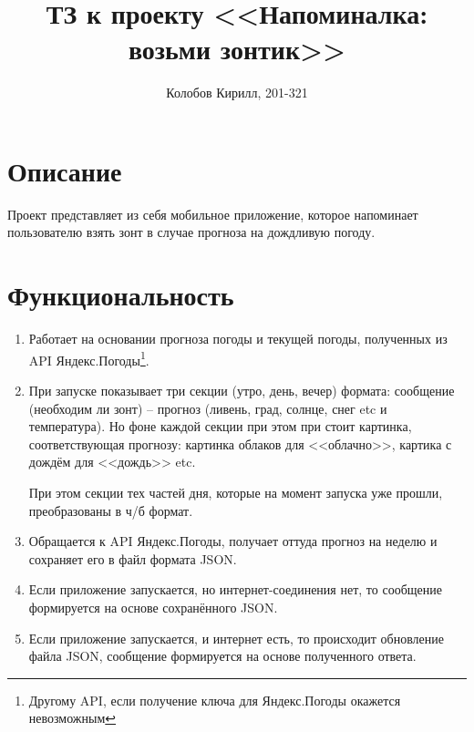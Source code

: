 \documentclass[a4paper,12pt]{report}
\author{Колобов Кирилл, 201-321}
\title{ТЗ к проекту <<Напоминалка: возьми зонтик>>}
\begin{document}
\maketitle

\tableofcontents
\newpage

\section{Описание}
Проект представляет из себя мобильное приложение, которое напоминает пользователю 
взять зонт в случае прогноза на дождливую погоду.

\section{Функциональность}
\begin{enumerate}
\item{Работает на основании прогноза погоды и текущей погоды, полученных из API Яндекс.Погоды\footnote{
      Другому API, если получение ключа для Яндекс.Погоды окажется невозможным}.}
\item{При запуске показывает три секции (утро, день, вечер) формата: 
      сообщение (необходим ли зонт) -- прогноз (ливень, град, солнце, снег etc и температура).
      Но фоне каждой секции при этом при стоит картинка, соответствующая 
      прогнозу: картинка облаков для <<облачно>>, картика с дождём для <<дождь>> etc.

      При этом секции тех частей дня, которые на момент запуска 
      уже прошли, преобразованы в ч/б формат.}
\item{Обращается к API Яндекс.Погоды, 
      получает оттуда прогноз на неделю и сохраняет его в файл формата JSON.}
\item{Если приложение запускается, но интернет-соединения нет, 
      то сообщение формируется на основе сохранённого JSON.}
\item{Если приложение запускается, и интернет есть, то происходит 
      обновление файла JSON, сообщение формируется на основе полученного ответа.}
\end{enumerate}
\end{document}
